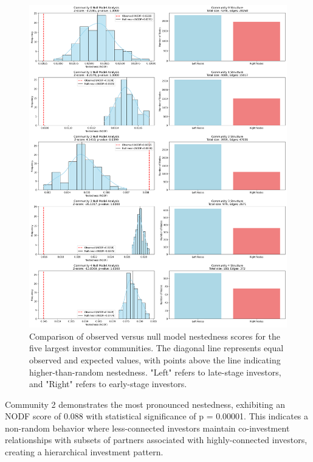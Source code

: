 \begin{figure}[htp]
\centering
\includegraphics[width=1\textwidth]{../figures/us/significant_communities_detailed.png}
\caption{Comparison of observed versus null model nestedness scores for the five largest investor communities. The diagonal line represents equal observed and expected values, with points above the line indicating higher-than-random nestedness. "Left" refers to late-stage investors, and "Right" refers to early-stage investors.}
\label{fig:nestedness_comparison}
\end{figure}

\newcommand{\interestingCommunity}{2}
\newcommand{\interestingCommunityNODF}{0.088}
\newcommand{\interestingCommunityPValue}{0.00001}

Community \interestingCommunity{} demonstrates the most pronounced nestedness, exhibiting an NODF score of \interestingCommunityNODF{} with statistical significance of p = \interestingCommunityPValue{}. This indicates a non-random behavior where less-connected investors maintain co-investment relationships with subsets of partners associated with highly-connected investors, creating a hierarchical investment pattern.

